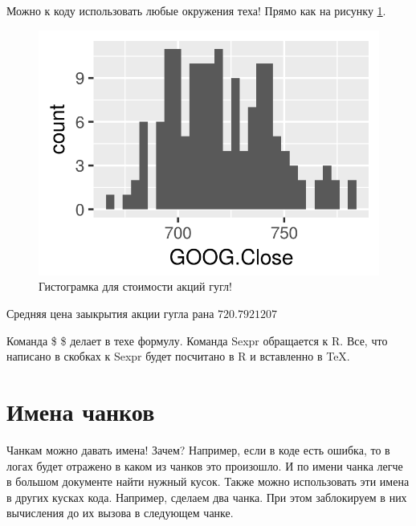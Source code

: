 \documentclass[a4paper]{article}\usepackage[]{graphicx}\usepackage[]{color}
\makeatletter
\def\maxwidth{ %
  \ifdim\Gin@nat@width>\linewidth
    \linewidth
  \else
    \Gin@nat@width
  \fi
}
\newenvironment{knitrout}{}{} %
\makeatother
\begin{document}
Можно к коду использовать любые окружения теха! Прямо как на рисунку \ref{fig}.

\begin{figure}[h!]
\begin{knitrout}
\color{fgcolor}

{\centering \includegraphics[width=\maxwidth]{figure/unnamed-chunk-4-1} 

}



\end{knitrout}
\caption{Гистограмка для стоимости акций гугл! \label{fig}}
\end{figure}


Средняя цена заыкрытия акции гугла рана $720.7921207$

Команда \$ \$ делает в техе формулу. Команда Sexpr обращается к R. Все, что написано в скобках к Sexpr будет посчитано в R и вставленно в \TeX. 


\section{Имена чанков}

Чанкам можно давать имена! Зачем? Например, если в коде есть ошибка, то в логах будет отражено в каком из чанков это произошло. И по имени чанка легче в большом документе найти нужный кусок. Также можно использовать эти имена в других кусках кода. Например, сделаем два чанка. При этом заблокируем в них вычисления до их вызова в следующем чанке.
\end{document}
